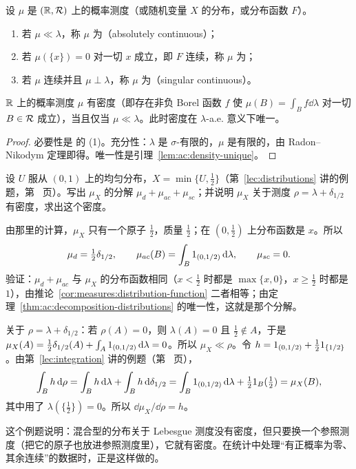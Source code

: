 \begin{definition}\label{def:ac:types}
设 $\mu$ 是 $(\mathbb{R},\mathcal{R})$ 上的概率测度（或随机变量 $X$ 的分布，或分布函数 $F$）。
\begin{enumerate}
\item 若 $\mu\ll\lambda$，称 $\mu$ 为（absolutely continuous）；
\item 若 $\mu(\{x\})=0$ 对一切 $x$ 成立，即 $F$ 连续，称 $\mu$ 为；
\item 若 $\mu$ 连续并且 $\mu\perp\lambda$，称 $\mu$ 为（singular continuous）。
\end{enumerate}
\end{definition}

\begin{theorem}[绝对连续的分布有密度]\label{thm:ac:ac-density}
$\mathbb{R}$ 上的概率测度 $\mu$ 有密度（即存在非负 Borel 函数 $f$ 使 $\mu(B)=\int_Bf\dd\lambda$ 对一切 $B\in\mathcal{R}$ 成立），当且仅当 $\mu\ll\lambda$。此时密度在 $\lambda$-a.e. 意义下唯一。
\end{theorem}
\begin{proof}
必要性是 的 (1)。充分性：$\lambda$ 是 $\sigma$-有限的，$\mu$ 是有限的，由 Radon--Nikodym 定理即得。唯一性是引理~\ref{lem:ac:density-unique}。
\end{proof}

\begin{workedexample}\label{we:ac:mixed-decomposition}
设 $U$ 服从 $(0,1)$ 上的均匀分布，$X=\min\{U,\frac12\}$（第~\ref{lec:distributions} 讲的例题，第~\pageref{we:distributions:mixed} 页）。写出 $\mu_X$ 的分解 $\mu_d+\mu_{ac}+\mu_{sc}$；并说明 $\mu_X$ 关于测度 $\rho=\lambda+\delta_{1/2}$ 有密度，求出这个密度。
\end{workedexample}
\begin{solution}
由那里的计算，$\mu_X$ 只有一个原子 $\frac12$，质量 $\frac12$；在 $(0,\frac12)$ 上分布函数是 $x$。所以
\[
\mu_d=\tfrac12\delta_{1/2},\qquad\mu_{ac}(B)=\int_B1_{(0,1/2)}\,\mathrm{d}\lambda,\qquad\mu_{sc}=0 .
\]
验证：$\mu_d+\mu_{ac}$ 与 $\mu_X$ 的分布函数相同（$x<\frac12$ 时都是 $\max\{x,0\}$，$x\geqslant\frac12$ 时都是 $1$），由推论~\ref{cor:measures:distribution-function} 二者相等；由定理~\ref{thm:ac:decomposition-distributions} 的唯一性，这就是那个分解。

关于 $\rho=\lambda+\delta_{1/2}$：若 $\rho(A)=0$，则 $\lambda(A)=0$ 且 $\frac12\notin A$，于是 $\mu_X(A)=\frac12\delta_{1/2}(A)+\int_A1_{(0,1/2)}\,\mathrm{d}\lambda=0$。所以 $\mu_X\ll\rho$。令 $h=1_{(0,1/2)}+\frac121_{\{1/2\}}$。由第~\ref{lec:integration} 讲的例题（第~\pageref{we:integration:four-step} 页），
\[
\int_Bh\,\mathrm{d}\rho=\int_Bh\,\mathrm{d}\lambda+\int_Bh\,\mathrm{d}\delta_{1/2}=\int_B1_{(0,1/2)}\,\mathrm{d}\lambda+\tfrac121_B(\tfrac12)=\mu_X(B),
\]
其中用了 $\lambda(\{\frac12\})=0$。所以 $\dd\mu_X/\dd\rho=h$。

这个例题说明：混合型的分布关于 Lebesgue 测度没有密度，但只要换一个参照测度（把它的原子也放进参照测度里），它就有密度。在统计中处理“有正概率为零、其余连续”的数据时，正是这样做的。
\end{solution}

